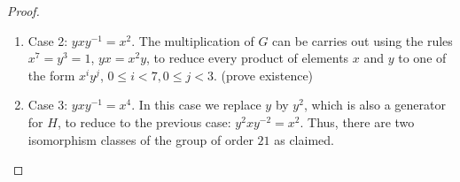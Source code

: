 \documentclass[12pt]{article}
\theoremstyle{definition}
\theoremstyle{remark}
\numberwithin{equation}{section}
\begin{document}
\begin{proof}
\begin{enumerate}
\begin{enumerate}
                                \item[] Case 2: $yxy^{-1} = x^2$. The multiplication of $G$ can be carries out using the rules $x^7=y^3 = 1$, $yx = x^2y$, to reduce every product of elements $x$ and $y$ to one of the form $x^iy^j$, $0\leq i < 7, 0 \leq j < 3$. (prove existence)
                                \item[] Case 3: $yxy^{-1} = x^4$. In this case we replace $y$ by $y^2$, which is also a generator for $H$, to reduce to the previous case: $y^2xy^{-2} = x^2$. Thus, there are two isomorphism classes of the group of order $21$ as claimed.
                        \end{enumerate}
        \end{enumerate}
\end{proof}


\vspace{15pt}
\end{document}
